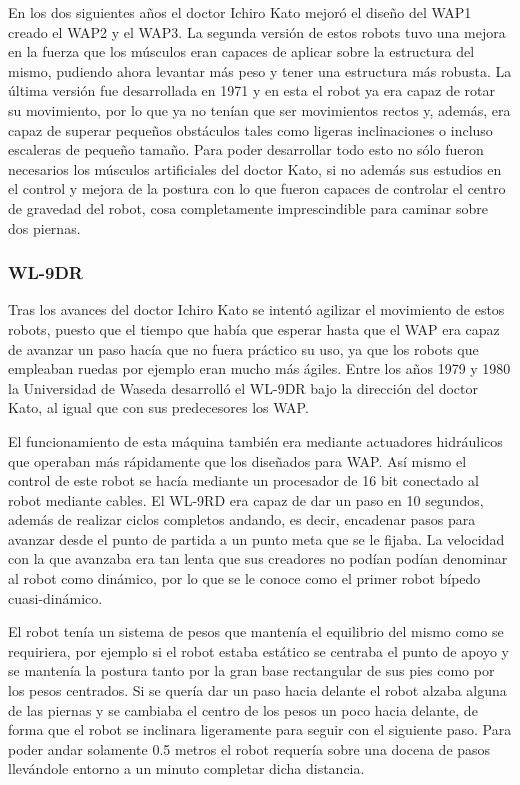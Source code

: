 \vspace{10px}

En los dos siguientes años el doctor Ichiro Kato mejoró el diseño del WAP1 creado el WAP2 y el WAP3. La segunda versión de estos robots tuvo una mejora en la fuerza que los músculos eran capaces de aplicar sobre la estructura del mismo, pudiendo ahora levantar más peso y tener una estructura más robusta. La última versión fue desarrollada en 1971 y en esta el robot ya era capaz de rotar su movimiento, por lo que ya no tenían que ser movimientos rectos y, además, era capaz de superar pequeños obstáculos tales como ligeras inclinaciones o incluso escaleras de pequeño tamaño. Para poder desarrollar todo esto no sólo fueron necesarios los músculos artificiales del doctor Kato, si no además sus estudios en el control y mejora de la postura con lo que fueron capaces de controlar el centro de gravedad del robot, cosa completamente imprescindible para caminar sobre dos piernas.

\subsubsection{WL-9DR}
Tras los avances del doctor Ichiro Kato se intentó agilizar el movimiento de estos robots, puesto que el tiempo que había que esperar hasta que el WAP era capaz de avanzar un paso hacía que no fuera práctico su uso, ya que los robots que empleaban ruedas por ejemplo eran mucho más ágiles. Entre los años 1979 y 1980 la Universidad de Waseda desarrolló el WL-9DR bajo la dirección del doctor Kato, al igual que con sus predecesores los WAP.

\vspace{10px}

El funcionamiento de esta máquina también era mediante actuadores hidráulicos que operaban más rápidamente que los diseñados para WAP. Así mismo el control de este robot se hacía mediante un procesador de 16 bit conectado al robot mediante cables. El WL-9RD era capaz de dar un paso en 10 segundos, además de realizar ciclos completos andando, es decir, encadenar pasos para avanzar desde el punto de partida a un punto meta que se le fijaba. La velocidad con la que avanzaba era tan lenta que sus creadores no podían podían denominar al robot como dinámico, por lo que se le conoce como el primer robot bípedo cuasi-dinámico.

\vspace{10px}

El robot tenía un sistema de pesos que mantenía el equilibrio del mismo como se requiriera, por ejemplo si el robot estaba estático se centraba el punto de apoyo y se mantenía la postura tanto por la gran base rectangular de sus pies como por los pesos centrados. Si se quería dar un paso hacia delante el robot alzaba alguna de las piernas y se cambiaba el centro de los pesos un poco hacia delante, de forma que el robot se inclinara ligeramente para seguir con el siguiente paso. Para poder andar solamente 0.5 metros el robot requería sobre una docena de pasos llevándole entorno a un minuto completar dicha distancia.

